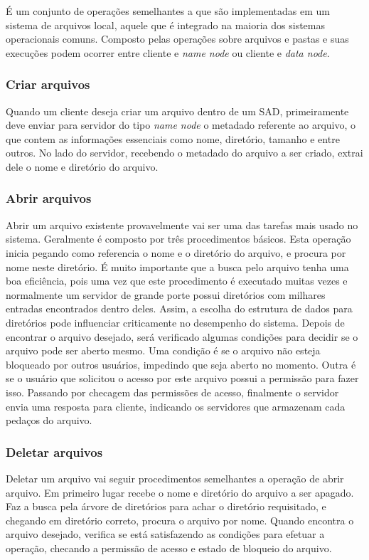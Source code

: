 	É um conjunto de operações semelhantes a que são implementadas em um sistema de arquivos local, aquele que é integrado na maioria dos sistemas operacionais comuns. Composto pelas operações sobre arquivos e pastas e suas execuções podem ocorrer entre cliente e \textit{name node} ou cliente e \textit{data node}.
	
	\subsubsection{Criar arquivos}
	
	Quando um cliente deseja criar um arquivo dentro de um SAD, primeiramente deve enviar para servidor do tipo \textit{name node} o metadado referente ao arquivo, o que contem as informações essenciais como nome, diretório, tamanho e entre outros. No lado do servidor, recebendo o metadado do arquivo a ser criado, extrai dele o nome e diretório do arquivo. 
	
	\subsubsection{Abrir arquivos}
	
	Abrir um arquivo existente provavelmente vai ser uma das tarefas mais usado no sistema. Geralmente é composto por três procedimentos básicos. Esta operação inicia pegando como referencia o nome e o diretório do arquivo, e procura por nome neste diretório. É muito importante que a busca pelo arquivo tenha uma boa eficiência, pois uma vez que este procedimento é executado muitas vezes e normalmente um servidor de grande porte possui  diretórios com milhares entradas encontrados dentro deles. Assim, a escolha do estrutura de dados para diretórios pode influenciar criticamente no desempenho do sistema. Depois de encontrar o arquivo desejado, será verificado algumas condições para decidir se o arquivo pode ser aberto mesmo. Uma condição é se o arquivo não esteja bloqueado por outros usuários, impedindo que seja aberto no momento. Outra é se o usuário que solicitou o acesso por este arquivo possui a permissão para fazer isso. Passando por checagem das permissões de acesso, finalmente o servidor envia uma resposta para cliente, indicando os servidores que armazenam cada pedaços do arquivo.
	 
	\subsubsection{Deletar arquivos}
	Deletar um arquivo vai seguir procedimentos semelhantes a operação de abrir arquivo. Em primeiro lugar recebe o nome e diretório do arquivo a ser apagado. Faz a busca pela árvore de diretórios para achar o diretório requisitado, e chegando em diretório correto, procura o arquivo por nome. Quando encontra o arquivo desejado, verifica se está satisfazendo as condições para efetuar a operação, checando a permissão de acesso e estado de bloqueio do arquivo.  
	
